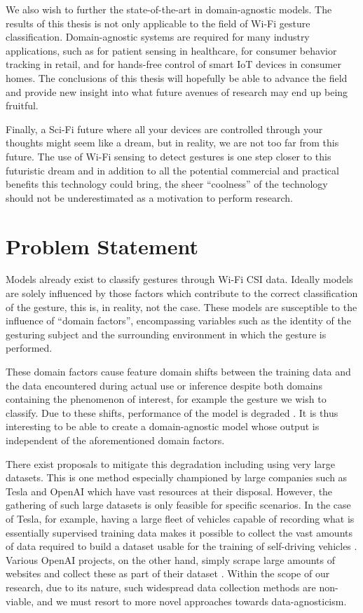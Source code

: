 We also wish to further the state-of-the-art in domain-agnostic models.
The results of this thesis is not only applicable to the field of Wi-Fi gesture classification.
Domain-agnostic systems are required for many industry applications, such as for patient sensing in healthcare, for consumer behavior tracking in retail, and for hands-free control of smart IoT devices in consumer homes.
The conclusions of this thesis will hopefully be able to advance the field and provide new insight into what future avenues of research may end up being fruitful.

Finally, a Sci-Fi future where all your devices are controlled through your thoughts might seem like a dream, but in reality, we are not too far from this future.
The use of Wi-Fi sensing to detect gestures is one step closer to this futuristic dream and in addition to all the potential commercial and practical benefits this technology could bring, the sheer ``coolness'' of the technology should not be underestimated as a motivation to perform research.

\section{Problem Statement}\label{sec:intro-problem-statement}
Models already exist to classify gestures through Wi-Fi CSI data.
Ideally models are solely influenced by those factors which contribute to the correct classification of the gesture, this is, in reality, not the case.
These models are susceptible to the influence of ``domain factors'', encompassing variables such as the identity of the gesturing subject and the surrounding environment in which the gesture is performed.

These domain factors cause feature domain shifts between the training data and the data encountered during actual use or inference despite both domains containing the phenomenon of interest, for example the gesture we wish to classify.
Due to these shifts, performance of the model is degraded \cite{chetty2011through,adib2013see,pu2013whole,adib20143d,he2015wig,jiang2018towards,zheng2019zero,jiang2020wigan,ma2021location}.
It is thus interesting to be able to create a domain-agnostic model whose output is independent of the aforementioned domain factors.

There exist proposals to mitigate this degradation including using very large datasets.
This is one method especially championed by large companies such as Tesla and OpenAI which have vast resources at their disposal.
However, the gathering of such large datasets is only feasible for specific scenarios.
In the case of Tesla, for example, having a large fleet of vehicles capable of recording what is essentially supervised training data makes it possible to collect the vast amounts of data required to build a dataset usable for the training of self-driving vehicles \cite{tesla2017data}.
Various OpenAI projects, on the other hand, simply scrape large amounts of websites and collect these as part of their dataset \cite{brown2020language}.
Within the scope of our research, due to its nature, such widespread data collection methods are non-viable, and we must resort to more novel approaches towards data-agnosticism.

